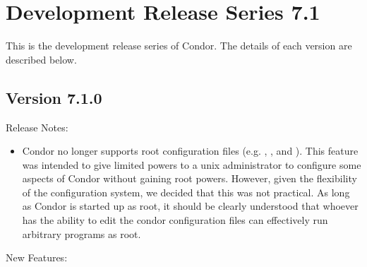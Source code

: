 
\section{\label{sec:History-7-1}Development Release Series 7.1}

This is the development release series of Condor.
The details of each version are described below.


\subsection*{\label{sec:New-7-1-0}Version 7.1.0}

\noindent Release Notes:

\begin{itemize}

\item Condor no longer supports root configuration files
(e.g. ,
, and
).  This feature was intended to
give limited powers to a unix administrator to configure some aspects
of Condor without gaining root powers.  However, given the flexibility
of the configuration system, we decided that this was not practical.
As long as Condor is started up as root, it should be clearly
understood that whoever has the ability to edit the condor
configuration files can effectively run arbitrary programs as root.

\end{itemize}


\noindent New Features:

